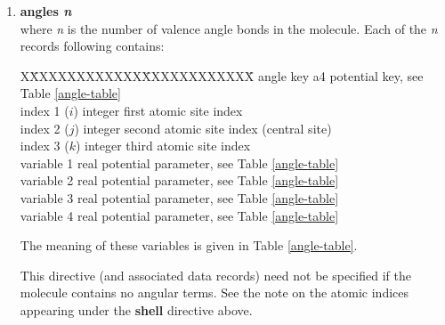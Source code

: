 \begin{enumerate}
\item{\bf angles {\em n}} \\
where {\em n} is the number of valence
angle bonds in the molecule.  Each
of the {\em n} records following contains:
\begin{tabbing}
X\=XXXXXXXXXXXX\=XXXXXXXXXXXX\=\kill
\> angle key     \> a4      \> potential key, see Table \ref{angle-table} \\
\> index 1 ($i$) \> integer \> first atomic site index \\
\> index 2 ($j$) \> integer \> second atomic site index (central site) \\
\> index 3 ($k$) \> integer \> third atomic site index \\
\> variable 1    \> real    \> potential parameter, see Table \ref{angle-table} \\
\> variable 2    \> real    \> potential parameter, see Table \ref{angle-table} \\
\> variable 3    \> real    \> potential parameter, see Table \ref{angle-table} \\
\> variable 4    \> real    \> potential parameter, see Table \ref{angle-table}
\end{tabbing}
The meaning of these variables is given in Table
\ref{angle-table}.

This directive (and associated data records) need not be specified
if the molecule contains no angular terms.  See the note on the
atomic indices appearing under the {\bf shell} directive above.


\end{enumerate}
